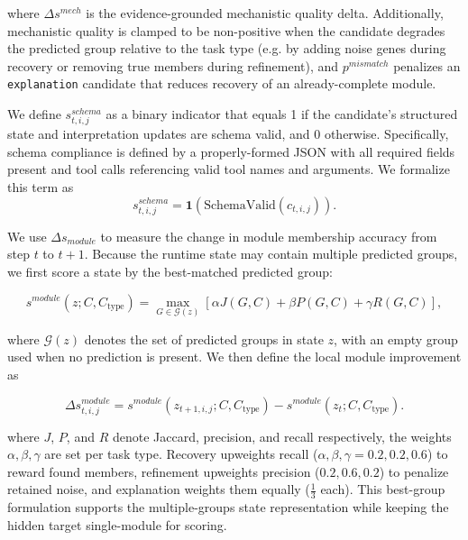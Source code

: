 \documentclass[thesis,letterpaper,12pt]{utthesis}
\begin{document}
where $\Delta s^{mech}$ is the evidence-grounded mechanistic quality delta. Additionally, mechanistic quality is clamped to be non-positive when the candidate degrades the predicted group relative to the task type (e.g. by adding noise genes during recovery or removing true members during refinement), and $p^{mismatch}$ penalizes an \texttt{explanation} candidate that reduces recovery of an already-complete module.

We define $s^{schema}_{t,i,j}$ as a binary indicator that equals 1 if the candidate's structured state and interpretation updates are schema valid, and 0 otherwise. Specifically, schema compliance is defined by a properly-formed JSON with all required fields present and tool calls referencing valid tool names and arguments. We formalize this term as
\begin{equation}\label{eqn:schema-score}
   s^{schema}_{t,i,j} = \mathbf{1}(\text{SchemaValid}(c_{t,i,j})).
\end{equation}

We use $\Delta s_{module}$ to measure the change in module membership accuracy from step $t$ to $t+1$. Because the runtime state may contain multiple predicted groups, we first score a state by the best-matched predicted group:

\begin{equation}\label{eqn:module-state-score}
    s^{module}(z; C, C_{\text{type}}) =
    \max_{G \in \mathcal{G}(z)}
    \left[
        \alpha J(G, C) + \beta P(G, C) + \gamma R(G, C)
    \right],
\end{equation}

where $\mathcal{G}(z)$ denotes the set of predicted groups in state $z$, with an empty group used when no prediction is present. We then define the local module improvement as

\begin{equation}\label{eqn:module-score}
        \Delta s^{module}_{t,i,j}
    =
    s^{module}(z_{t+1,i,j}; C, C_{\text{type}})
    -
    s^{module}(z_t; C, C_{\text{type}}).
\end{equation}

where $J$, $P$, and $R$ denote Jaccard, precision, and recall respectively, the weights $\alpha, \beta, \gamma$ are set per task type. Recovery upweights recall ($\alpha,\beta,\gamma = 0.2, 0.2, 0.6$) to reward found members, refinement upweights precision ($0.2, 0.6, 0.2$) to penalize retained noise, and explanation weights them equally ($\tfrac{1}{3}$ each). This best-group formulation supports the multiple-groups state representation while keeping the hidden target single-module for scoring.
\end{document}
